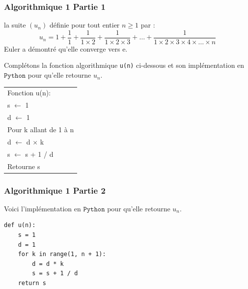 \documentclass[11pt, hyperref={urlcolor=red,%
            linkcolor=blue, %
            colorlinks=true}]{beamer}
\begin{document}
 
\begin{frame}[fragile]
\label{algo1}
\frametitle{Algorithmique 1 Partie 1}

la suite $\left(u_{n}\right)$ définie pour tout entier $n \geqslant 1$ par :
\begin{equation*}
u_{n}=1+\frac{1}{1} + \frac{1}{1 \times 2} + \frac{1}{1 \times 2 \times 3} + \ldots + \frac{1}{1 \times 2 \times 3 \times 4 \times \ldots \times n}
\end{equation*}
Euler a démontré qu'elle converge vers $\text{e}$.

Complétons la fonction algorithmique \texttt{u(n)} ci-dessous et son implémentation en $\texttt{Python}$ pour qu'elle retourne $u_{n}$.
	
	
\begin{center}
{\ttfamily 
\begin{tabular}{|l|}\hline 
Fonction u(n):\\
\hspace{0.5cm}s $\longleftarrow$ 1\\
\hspace{0.5cm}d $\longleftarrow$ 1\\
\hspace{0.5cm}Pour k allant de 1 à n \\
\hspace{1 cm}d $\longleftarrow$ d $\times$ k \\
\hspace{1 cm}s  $\longleftarrow$ s + 1 / d\\
\hspace{0.5cm}Retourne s \\
\hline
\end{tabular}
}
\end{center}

\end{frame}


 
\begin{frame}[fragile]
\frametitle{Algorithmique 1 Partie 2}
Voici  l'implémentation en $\texttt{Python}$ pour qu'elle retourne $u_{n}$.
	

\begin{center}
\begin{lstlisting}[style=rond]
def u(n):
	s = 1
	d = 1
	for k in range(1, n + 1):
		d = d * k
		s = s + 1 / d
	return s		
\end{lstlisting}
\end{center}

\end{frame}
\end{document}
